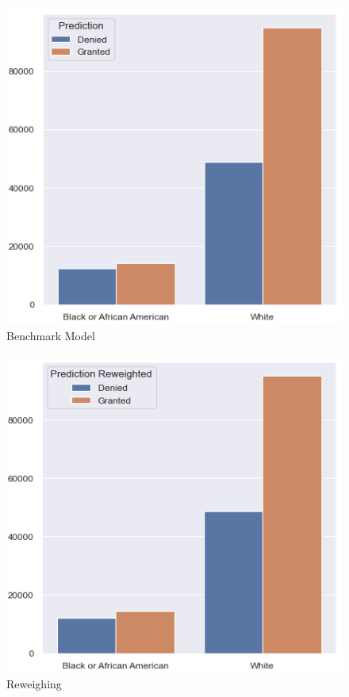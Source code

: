 \begin{figure}[!htbp]
    \centering
    \begin{minipage}{0.5\textwidth}
        \centering
        \includegraphics[width=\textwidth]{images/loan_grants_by_protected_attributes/initial.png}
        \small
        Benchmark Model
    \end{minipage}\hfill
    \begin{minipage}{0.5\textwidth}
        \centering
        \includegraphics[width=\textwidth]{images/loan_grants_by_protected_attributes/reweighted.png}
        \small
        Reweighing
    \end{minipage}
    

\end{figure}
